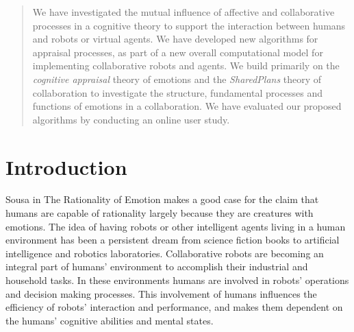 \documentclass{aamas2016}
\begin{document}
\maketitle

\begin{abstract}
We have investigated the mutual influence of affective and collaborative
processes in a cognitive theory to support the interaction between humans and
robots or virtual agents. We have developed new algorithms for appraisal
processes, as part of a new overall computational model for implementing
collaborative robots and agents. We build primarily on the \textit{cognitive
appraisal} theory of emotions and the \textit{SharedPlans} theory of
collaboration to investigate the structure, fundamental processes and functions
of emotions in a collaboration. We have evaluated our proposed algorithms by
conducting an online user study.
\end{abstract}








\section{Introduction}
Sousa in The Rationality of Emotion \cite{sousa:rationality-emotion}
makes a good case for the claim that humans are capable of rationality largely
because they are creatures with emotions. The idea of having robots or other
intelligent agents living in a human environment has been a persistent dream
from science fiction books to artificial intelligence and robotics laboratories.
Collaborative robots are becoming an integral part of humans' environment to
accomplish their industrial and household tasks. In these environments humans
are involved in robots' operations and decision making processes. This
involvement of humans influences the efficiency of robots' interaction and
performance, and makes them dependent on the humans' cognitive abilities and
mental states.
\end{document}
